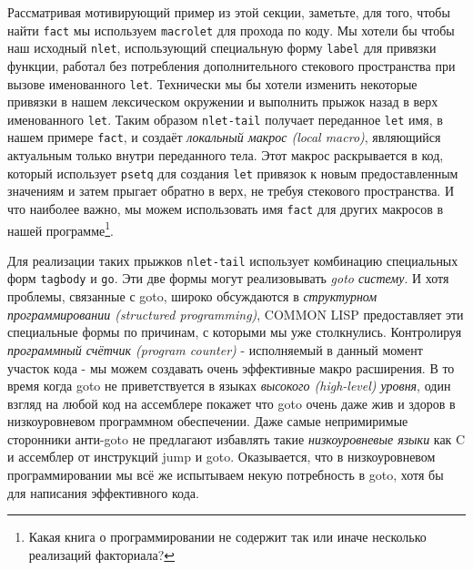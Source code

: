 Рассматривая мотивирующий пример из этой секции, заметьте, для того, чтобы найти \verb"fact" мы используем \verb"macrolet" для прохода по коду. Мы хотели бы чтобы наш исходный \verb"nlet", использующий специальную форму \verb"label" для привязки функции, работал без потребления дополнительного стекового пространства при вызове именованного \verb"let". Технически мы бы хотели изменить некоторые привязки в нашем лексическом окружении и выполнить прыжок назад в верх именованного \verb"let". Таким образом \verb"nlet-tail" получает переданное \verb"let" имя, в нашем примере \verb"fact", и создаёт \emph{локальный макрос (local macro)}, являющийся актуальным только внутри переданного тела. Этот макрос раскрывается в код, который использует \verb"psetq" для создания \verb"let" привязок к новым предоставленным значениям и затем прыгает обратно в верх, не требуя стекового пространства. И что наиболее важно, мы можем использовать имя \verb"fact" для других макросов в нашей программе\footnote{Какая книга о программировании не содержит так или иначе несколько реализаций факториала?}.



Для реализации таких прыжков \verb"nlet-tail" использует комбинацию специальных форм \verb"tagbody" и \verb"go". Эти две формы могут реализовывать \emph{goto систему}. И хотя проблемы, связанные с goto, широко обсуждаются в \emph{структурном программировании (structured programming)}, COMMON LISP предоставляет эти специальные формы по причинам, с которыми мы уже столкнулись. Контролируя \emph{программный счётчик (program counter)} - исполняемый в данный момент участок кода - мы можем создавать очень эффективные макро расширения. В то время когда goto не приветствуется в языках \emph{высокого (high-level) уровня}, один взгляд на любой код на ассемблере покажет что goto очень даже жив и здоров в низкоуровневом программном обеспечении. Даже самые непримиримые сторонники анти-goto не предлагают избавлять такие \emph{низкоуровневые языки} как C и ассемблер от инструкций jump и goto. Оказывается, что в низкоуровневом программировании мы всё же испытываем некую потребность в goto, хотя бы для написания эффективного кода.

